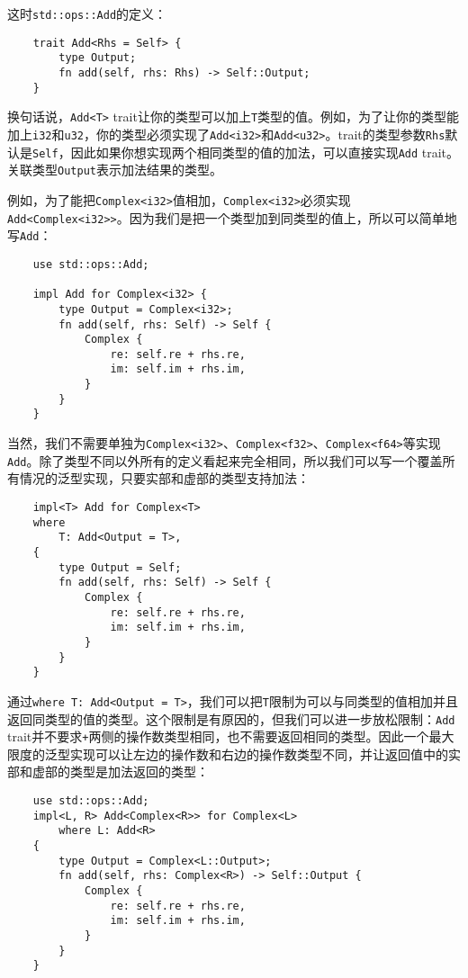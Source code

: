 这时\texttt{std::ops::Add}的定义：
\begin{verbatim}
    trait Add<Rhs = Self> {
        type Output;
        fn add(self, rhs: Rhs) -> Self::Output;
    }
\end{verbatim}

换句话说，\texttt{Add<T>} trait让你的类型可以加上\texttt{T}类型的值。例如，为了让你的类型能加上\texttt{i32}和\texttt{u32}，你的类型必须实现了\texttt{Add<i32>}和\texttt{Add<u32>}。trait的类型参数\texttt{Rhs}默认是\texttt{Self}，因此如果你想实现两个相同类型的值的加法，可以直接实现\texttt{Add} trait。关联类型\texttt{Output}表示加法结果的类型。

例如，为了能把\texttt{Complex<i32>}值相加，\texttt{Complex<i32>}必须实现\texttt{Add<Complex<i32>>}。因为我们是把一个类型加到同类型的值上，所以可以简单地写\texttt{Add}：
\begin{verbatim}
    use std::ops::Add;

    impl Add for Complex<i32> {
        type Output = Complex<i32>;
        fn add(self, rhs: Self) -> Self {
            Complex {
                re: self.re + rhs.re,
                im: self.im + rhs.im,
            }
        }
    }
\end{verbatim}

当然，我们不需要单独为\texttt{Complex<i32>}、\texttt{Complex<f32>}、\texttt{Complex<f64>}等实现\texttt{Add}。除了类型不同以外所有的定义看起来完全相同，所以我们可以写一个覆盖所有情况的泛型实现，只要实部和虚部的类型支持加法：
\begin{verbatim}
    impl<T> Add for Complex<T>
    where
        T: Add<Output = T>,
    {
        type Output = Self;
        fn add(self, rhs: Self) -> Self {
            Complex {
                re: self.re + rhs.re,
                im: self.im + rhs.im,
            }
        }
    }
\end{verbatim}

通过\texttt{where T: Add<Output = T>}，我们可以把\texttt{T}限制为可以与同类型的值相加并且返回同类型的值的类型。这个限制是有原因的，但我们可以进一步放松限制：\texttt{Add} trait并不要求\texttt{+}两侧的操作数类型相同，也不需要返回相同的类型。因此一个最大限度的泛型实现可以让左边的操作数和右边的操作数类型不同，并让返回值中的实部和虚部的类型是加法返回的类型：
\begin{verbatim}
    use std::ops::Add;
    impl<L, R> Add<Complex<R>> for Complex<L>
        where L: Add<R>
    {
        type Output = Complex<L::Output>;
        fn add(self, rhs: Complex<R>) -> Self::Output {
            Complex {
                re: self.re + rhs.re,
                im: self.im + rhs.im,
            }
        }
    }
\end{verbatim}

